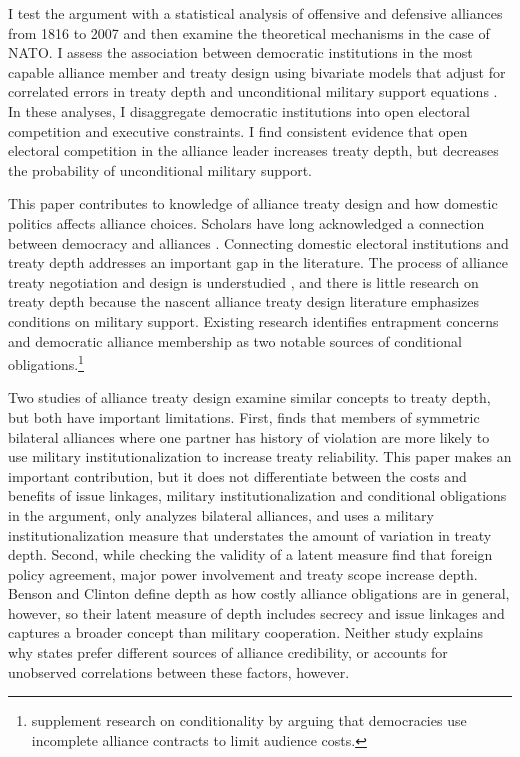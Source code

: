 \documentclass[12pt]{article}
\begin{document}
I test the argument with a statistical analysis of offensive and defensive alliances from 1816 to 2007 and then examine the theoretical mechanisms in the case of NATO.
I assess the association between democratic institutions in the most capable alliance member and treaty design using bivariate models that adjust for correlated errors in treaty depth and unconditional military support equations \citep{Braumoelleretal2018}. 
In these analyses, I disaggregate democratic institutions into open electoral competition and executive constraints.
I find consistent evidence that open electoral competition in the alliance leader increases treaty depth, but decreases the probability of unconditional military support. 


This paper contributes to knowledge of alliance treaty design and how domestic politics affects alliance choices.
Scholars have long acknowledged a connection between democracy and alliances \citep{LaiReiter2000, GiblerWolford2006, Mattes2012, Warren2016, McManusYarhi-Milo2017}. 
Connecting domestic electoral institutions and treaty depth addresses an important gap in the literature. 
The process of alliance treaty negotiation and design is understudied \citep{Poast2019a}, and there is little research on treaty depth because the nascent alliance treaty design literature emphasizes conditions on military support.
Existing research identifies entrapment concerns \citep{Kim2011, Benson2012} and democratic alliance membership \citep{Mattes2012, Chibaetal2015} as two notable sources of conditional obligations.\footnote{\citet{FjelstulReiter2019} supplement research on conditionality by arguing that democracies use incomplete alliance contracts to limit audience costs.} 


Two studies of alliance treaty design examine similar concepts to treaty depth, but both have important limitations.   
First, \citet{Mattes2012} finds that members of symmetric bilateral alliances where one partner has history of violation are more likely to use military institutionalization to increase treaty reliability. 
This paper makes an important contribution, but it does not differentiate between the costs and benefits of issue linkages, military institutionalization and conditional obligations in the argument, only analyzes bilateral alliances, and uses a military institutionalization measure \citep{LeedsAnac2005} that understates the amount of variation in treaty depth.  
Second, while checking the validity of a latent measure \citet{BensonClinton2016} find that foreign policy agreement, major power involvement and treaty scope increase depth. 
Benson and Clinton define depth as how costly alliance obligations are in general, however, so their latent measure of depth includes secrecy and issue linkages and captures a broader concept than military cooperation. 
Neither study explains why states prefer different sources of alliance credibility, or accounts for unobserved correlations between these factors, however. 
\end{document}
